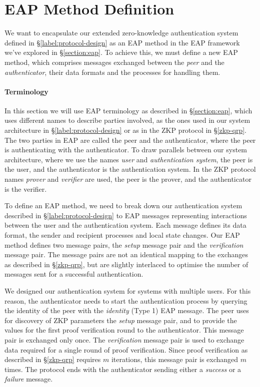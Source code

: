 \section{EAP Method Definition}
\label{section:eap-84-definition}
We want to encapsulate our extended zero-knowledge authentication system defined in \S\ref{label:protocol-design} as an EAP method in the EAP framework we've explored in \S\ref{section:eap}.
To achieve this, we must define a new EAP method, which comprises messages exchanged between the \textit{peer} and the \textit{authenticator}, their data formats and the processes for handling them.

\paragraph{Terminology}
In this section we will use EAP terminology as described in \S\ref{section:eap}, which uses different names to describe parties involved, as the ones used in our system architecture in \S\ref{label:protocol-design} or as in the ZKP protocol in \S\ref{zkp-qrp}.
The two parties in EAP are called the peer and the authenticator, where the peer is authenticating with the authenticator.
To draw parallels between our system architecture, where we use the names \textit{user} and \textit{authentication system}, the peer is the user, and the authenticator is the authentication system.
In the ZKP protocol names \textit{prover} and \textit{verifier} are used, the peer is the prover, and the authenticator is the verifier.

\bigskip
\noindent
To define an EAP method, we need to break down our authentication system described in \S\ref{label:protocol-design} to EAP messages representing interactions between the user and the authentication system.
Each message defines its data format, the sender and recipient processes and local state changes.
Our EAP method defines two message pairs, the \textit{setup} message pair and the \textit{verification} message pair.
The message pairs are not an identical mapping to the exchanges as described in \S\ref{zkp-qrp}, but are slightly interlaced to optimise the number of messages sent for a successful authentication.

We designed our authentication system for systems with multiple users. For this reason, the authenticator needs to start the authentication process by querying the identity of the peer with the \textit{identity} (Type 1) EAP message.
The peer uses for discovery of ZKP parameters the \textit{setup} message pair, and to provide the values for the first proof verification round to the authenticator.
This message pair is exchanged only once.
The \textit{verification} message pair is used to exchange data required for a single round of proof verification. Since proof verification as described in \S\ref{zkp-qrp} requires $m$ iterations, this message pair is exchanged $m$ times.
The protocol ends with the authenticator sending either a \textit{success} or a \textit{failure} message.


